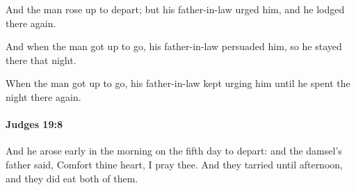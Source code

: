 			\begin{versebox}
					\item[BHS] 
					\item[ASV] And the man rose up to depart; but his father-in-law urged him, and he lodged there again.
					\item[NIV] And when the man got up to go, his father-in-law persuaded him, so he stayed there that night.
					\item[NRSV] When the man got up to go, his father-in-law kept urging him until he spent the night there again.
			\end{versebox}

		\paragraph{Judges 19:8} %
			\label{JUDGES-19-8}

			And he arose early in the morning on the fifth day to depart: and the damsel’s father said, Comfort thine heart, I pray thee. And they tarried until afternoon, and they did eat both of them.

